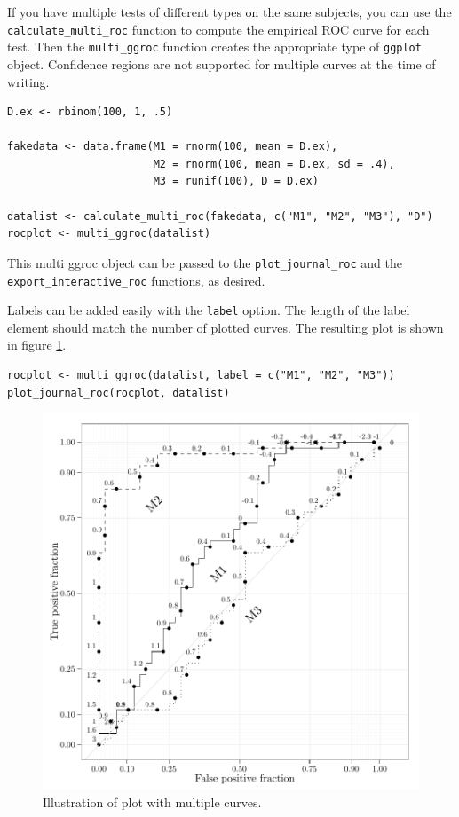 \documentclass[article]{jss}
\begin{document}
If you have multiple tests of different types on the same subjects, you
can use the \texttt{calculate\_multi\_roc} function to compute the
empirical ROC curve for each test. Then the \texttt{multi\_ggroc}
function creates the appropriate type of \texttt{ggplot} object.
Confidence regions are not supported for multiple curves at the time of
writing.

\begin{verbatim}
D.ex <- rbinom(100, 1, .5)

fakedata <- data.frame(M1 = rnorm(100, mean = D.ex), 
                       M2 = rnorm(100, mean = D.ex, sd = .4), 
                       M3 = runif(100), D = D.ex)

datalist <- calculate_multi_roc(fakedata, c("M1", "M2", "M3"), "D")
rocplot <- multi_ggroc(datalist)
\end{verbatim}

This multi ggroc object can be passed to the \texttt{plot\_journal\_roc}
and the \texttt{export\_interactive\_roc} functions, as desired.

Labels can be added easily with the \texttt{label} option. The length of
the label element should match the number of plotted curves. The
resulting plot is shown in figure \ref{multi}.

\begin{verbatim}
rocplot <- multi_ggroc(datalist, label = c("M1", "M2", "M3"))
plot_journal_roc(rocplot, datalist)
\end{verbatim}

\begin{figure}[htbp]
\centering
\includegraphics{figure/multi2-1.pdf}
\caption{Illustration of  plot with multiple curves.
\label{multi}}
\end{figure}
\end{document}
